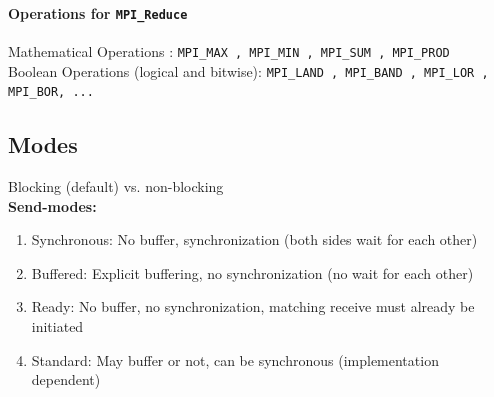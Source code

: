 \paragraph{Operations for \texttt{MPI\_Reduce}}
Mathematical Operations : \texttt{MPI\_MAX , MPI\_MIN , MPI\_SUM , MPI\_PROD} \\
Boolean Operations (logical and bitwise): \texttt{MPI\_LAND , MPI\_BAND , MPI\_LOR , MPI\_BOR, ...}\\

\subsection{Modes}

Blocking (default) vs. non-blocking\\

\textbf{Send-modes:}\\
\begin{enumerate}
	\item Synchronous: No buffer, synchronization (both sides wait for each other)
	\item Buffered:	Explicit buffering, no synchronization (no wait for each other)
	\item Ready: No buffer, no synchronization, matching receive must already be initiated
	\item Standard: May buffer or not, can be synchronous (implementation dependent)
\end{enumerate}




